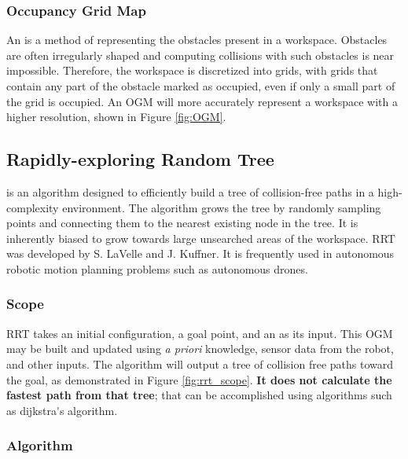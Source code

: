     

    \subsubsection{Occupancy Grid Map}
    An  is a method of representing the obstacles present in a \gls{workspace}. Obstacles are often irregularly shaped and computing collisions with such obstacles is near impossible. Therefore, the \gls{workspace} is discretized into grids, with grids that contain any part of the obstacle marked as occupied, even if only a small part of the grid is occupied. An \gls{OGM} will more accurately represent a \gls{workspace} with a higher resolution, shown in Figure \ref{fig:OGM}.

    

\subsection{Rapidly-exploring Random Tree}
    
     is an algorithm designed to efficiently build a tree of collision-free paths in a high-complexity environment. The algorithm grows the tree by randomly sampling points and connecting them to the nearest existing node in the tree. It is inherently biased to grow towards large unsearched areas of the workspace. RRT was developed by S. LaVelle\cite{LaValle1998} and J. Kuffner\cite{LaValle2001}. It is frequently used in autonomous robotic motion planning problems such as autonomous drones.

    \subsubsection{Scope}
        \gls{RRT} takes an initial configuration, a goal point, and an  as its input. This \gls{OGM} may be built and updated using \textit{\gls{a priori}} knowledge, sensor data from the robot, and other inputs. The algorithm will output a tree of collision free paths toward the goal, as demonstrated in Figure \ref{fig:rrt_scope}. \textbf{It does not calculate the fastest path from that tree}; that can be accomplished using algorithms such as \Gls{dijkstra's algorithm}.

        

    \subsubsection{Algorithm}

